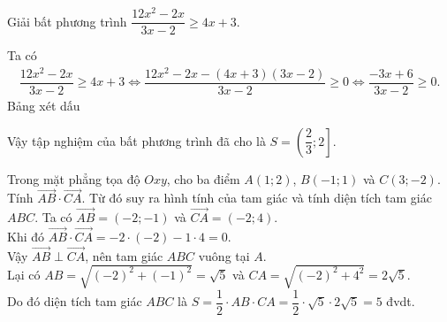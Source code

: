 \begin{bt}%
 Giải bất phương trình $\dfrac{12x^2-2x}{3x-2}\geq 4x+3$.
 \loigiai
  {
  Ta có
  \begin{eqnarray*}
   \dfrac{12x^2-2x}{3x-2}\geq 4x+3 \Leftrightarrow \dfrac{12x^2-2x-(4x+3)(3x-2)}{3x-2}\geq 0 \Leftrightarrow \dfrac{-3x+6}{3x-2} \geq 0.
  \end{eqnarray*}
  Bảng xét dấu
  \begin{center}
  \end{center}
  Vậy tập nghiệm của bất phương trình đã cho là $S=\left(\dfrac{2}{3};2\right]$.
  }
\end{bt}

\begin{bt}%
 Trong mặt phẳng tọa độ $Oxy$, cho ba điểm $A(1;2)$, $B(-1;1)$ và $C(3;-2)$. Tính $\overrightarrow{AB}\cdot\overrightarrow{CA}$. Từ đó suy ra hình tính của tam giác và tính diện tích tam giác $ABC$.
 \loigiai
  {
   Ta có $\overrightarrow{AB}=(-2;-1)$ và $\overrightarrow{CA}=(-2;4)$.\\
   Khi đó $\overrightarrow{AB}\cdot\overrightarrow{CA}=-2\cdot(-2)-1\cdot 4 = 0$.\\
   Vậy $\overrightarrow{AB}\perp\overrightarrow{CA}$, nên tam giác $ABC$ vuông tại $A$.\\
   Lại có $AB=\sqrt{(-2)^2+(-1)^2}=\sqrt{5}$ và $CA=\sqrt{(-2)^2+4^2}=2\sqrt{5}$.\\
   Do đó diện tích tam giác $ABC$ là $S=\dfrac{1}{2}\cdot AB \cdot CA = \dfrac{1}{2}\cdot\sqrt{5}\cdot 2\sqrt{5}=5$ đvdt.
  }
\end{bt}

